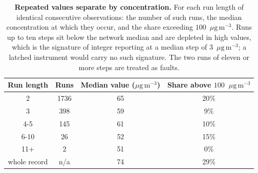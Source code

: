 \documentclass[11pt]{article}
\newcommand*{\ugm}{\ensuremath{\mu\mathrm{g\,m^{-3}}}}
\begin{document}
\begin{table}[htbp]\centering\footnotesize
\caption{\textbf{Repeated values separate by concentration.} For each run length of identical consecutive observations: the number of such runs, the median concentration at which they occur, and the share exceeding $100$~\ugm{}. Runs up to ten steps sit below the network median and are depleted in high values, which is the signature of integer reporting at a median step of $3$~\ugm{}; a latched instrument would carry no such signature. The two runs of eleven or more steps are treated as faults.}
\begin{tabular}{cccc}\toprule
Run length & Runs & Median value (\ugm) & Share above $100$~\ugm \\ \midrule
2 & 1736 & 65 & 20\% \\
3 & 398 & 59 & 9\% \\
4-5 & 145 & 61 & 10\% \\
6-10 & 26 & 52 & 15\% \\
11+ & 2 & 51 & 0\% \\
\midrule
whole record & n/a & 74 & 29\% \\
\bottomrule\end{tabular}\end{table}
\end{document}
